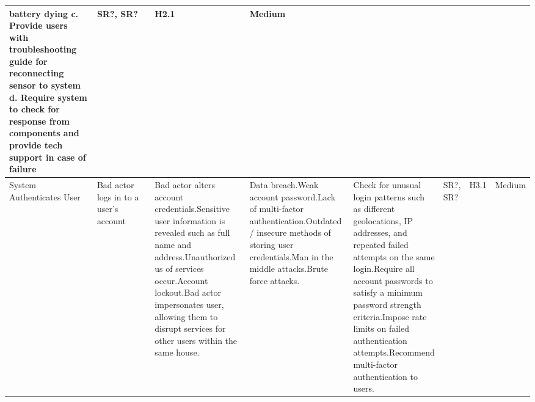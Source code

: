 \documentclass{article}
\begin{document}
\begin{table}[H]
\begin{adjustbox}{width=\textwidth}
\begin{tabular}{|p{0.25\linewidth} | p{0.25\linewidth} | p{0.22\linewidth}|  p{0.22\linewidth}|  p{0.30\linewidth}|  p{0.085\linewidth}|  p{0.05\linewidth}|p{0.12\linewidth}| }
battery dying \newline c. Provide users with troubleshooting guide for reconnecting sensor to system \newline d. Require system to check for response from components and provide tech support in case of failure   & SR?, SR? & H2.1 & Medium\\
         \hline
         System Authenticates User & Bad actor logs in to a user's account& Bad actor alters account credentials.\newline\newline Sensitive user information is revealed such as full name and address.\newline\newline Unauthorized us of services occur.\newline\newline Account lockout.\newline\newline Bad actor impersonates user, allowing them to disrupt services for other users within the same house. & Data breach.\newline\newline Weak account password.\newline\newline Lack of multi-factor authentication.\newline\newline Outdated / insecure methods of storing user credentials.\newline\newline Man in the middle attacks.\newline\newline Brute force attacks. & Check for unusual login patterns such as different geolocations, IP addresses, and repeated failed attempts on the same login.\newline\newline Require all account passwords to satisfy a minimum password strength criteria.\newline\newline Impose rate limits on failed authentication attempts.\newline\newline Recommend multi-factor authentication to users. & SR?, SR? & H3.1 & Medium\\
         \hline
         

\end{tabular}
\end{adjustbox}
\end{table}
\end{document}
